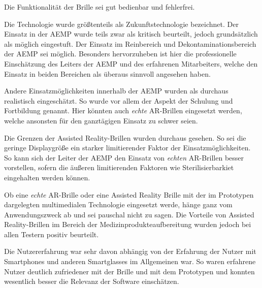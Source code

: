 Die Funktionalität der Brille sei gut bedienbar und fehlerfrei.

Die Technologie wurde größtenteils als Zukunftstechnologie bezeichnet. Der Einsatz in der AEMP wurde teils zwar als kritisch beurteilt, jedoch grundsätzlich als möglich eingestuft. Der Einsatz im Reinbereich und Dekontaminationsbereich der AEMP sei möglich. Besonders hervorzuheben ist hier die professionelle Einschätzung des Leiters der AEMP und des erfahrenen Mitarbeiters, welche den Einsatz in beiden Bereichen als überaus sinnvoll angesehen haben.

Andere Einsatzmöglichkeiten innerhalb der AEMP wurden als durchaus realistisch eingeschätzt. So wurde vor allem der Aspekt der Schulung und Fortbildung genannt. Hier könnten auch \emph{echte} AR-Brillen eingesetzt werden, welche ansonsten für den ganztägigen Einsatz zu schwer seien.

Die Grenzen der Assisted Reality-Brillen wurden durchaus gesehen. So sei die geringe Displaygröße ein starker limitierender Faktor der Einsatzmöglichkeiten. So kann sich der Leiter der AEMP den Einsatz von \emph{echten} AR-Brillen besser vorstellen, sofern die äußeren limitierenden Faktoren wie Sterilisierbarkiet eingehalten werden können.

Ob eine \emph{echte} AR-Brille oder eine Assisted Reality Brille mit der im Prototypen dargelegten multimedialen Technologie eingesetzt werde, hänge ganz vom Anwendungszweck ab und sei pauschal nicht zu sagen. Die Vorteile von Assisted Reality-Brillen im Bereich der Medizinprodukteaufbereitung wurden jedoch bei allen Testern positiv beurteilt.

Die Nutzererfahrung war sehr davon abhängig von der Erfahrung der Nutzer mit Smartphones und anderen Smartglasses im Allgemeinen war. So waren erfahrene Nutzer deutlich zufriedener mit der Brille und mit dem Prototypen und konnten wesentlich besser die Relevanz der Software einschätzen. 